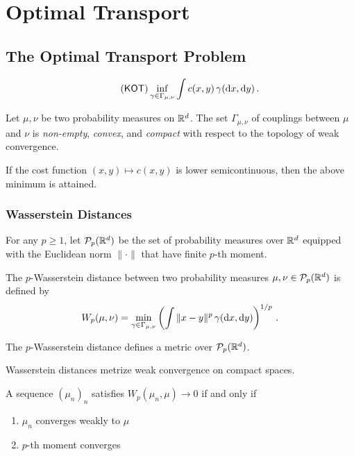 \chapter{Optimal Transport}

\section{The Optimal Transport Problem}

\begin{equation}
\label{KOT}\tag{\textsf{KOT}}
\inf_{\gamma \in \Gamma_{\mu, \nu}} \int c(x, y)\, \gamma(\d x,\d y)\,.
\end{equation}


\begin{proposition}\label{prop:couplings}
    Let $\mu, \nu$ be two probability measures on $\mathbb{R}^d$. The set $\Gamma_{\mu, \nu}$ of couplings between $\mu$ and $\nu$ is \emph{non-empty}, \emph{convex}, and \emph{compact} with respect to the topology of weak convergence.
\end{proposition}

\begin{proposition}
    If the cost function $(x,y)\mapsto c(x,y)$ is lower semicontinuous, then the above minimum is attained.
\end{proposition}

\subsection{Wasserstein Distances}
For any $p\geq 1$, let $\mathcal{P}_p(\mathbb{R}^d)$ be the set of probability measures over $\mathbb{R}^d$ equipped with the Euclidean norm $\|\cdot\|$ that have finite $p$-th moment.
\begin{definition}\label{def:wass}
The $p$-Wasserstein distance between two probability measures $\mu, \nu \in \mathcal{P}_p(\mathbb{R}^d)$ is defined by
\begin{equation*}
W_p(\mu, \nu)=\min_{\gamma \in \Gamma_{\mu, \nu}}\left( \int \|x-y\|^p\, \gamma(\mathrm{d} x,\mathrm{d} y)\right)^{1/p}\,.
\end{equation*}
\end{definition}

\begin{proposition}
    The $p$-Wasserstein distance defines a metric over $\mathcal{P}_p(\mathbb{R}^d)$.
\end{proposition}

Wasserstein distances metrize weak convergence on compact spaces.
\begin{proposition}
    A sequence $(\mu_n)_n$ satisfies $W_p(\mu_n,\mu)\to 0$ if and only if 
    \begin{enumerate}[label=(\roman*)]
        \item $\mu_n$ converges weakly to $\mu$
        \item $p$-th moment converges
    \end{enumerate}
\end{proposition}

